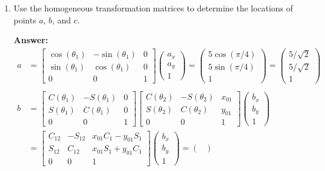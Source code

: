 \documentclass[10pt,letterpaper]{article}
\begin{document}
\begin{enumerate}
\item Use the homogeneous transformation matrices to determine the locations of points $ a$, $ b$, and $ c$.

\textbf{Answer: }\begin{align*}
a &= \begin{bmatrix}
\cos(\theta_1) & -\sin(\theta_1) & 0 \\
\sin(\theta_1) &  \cos(\theta_1) & 0 \\
0 & 0 & 1
\end{bmatrix} \begin{pmatrix}
a_x \\
a_y \\
1
\end{pmatrix} = \begin{pmatrix}
5\cos(\pi/4) \\
5\sin(\pi/4) \\
1
\end{pmatrix} = \begin{pmatrix}
5/\sqrt{2} \\
5/\sqrt{2} \\
1
\end{pmatrix} \\
\\
b &= \begin{bmatrix}
C(\theta_1) & -S(\theta_1) & 0 \\
S(\theta_1) &  C(\theta_1) & 0 \\
0 & 0 & 1
\end{bmatrix} \begin{bmatrix}
C(\theta_2) & -S(\theta_2) & x_{01} \\
S(\theta_2) &  C(\theta_2) & y_{01} \\
0 & 0 & 1
\end{bmatrix} \begin{pmatrix}
b_x \\
b_y \\
1
\end{pmatrix} \\
&= \begin{bmatrix}
C_{12} & -S_{12} & x_{01}C_1-y_{01}S_1 \\
S_{12} &  C_{12} & x_{01}S_1+y_{01}C_1 \\
0 & 0 & 1
\end{bmatrix} \begin{pmatrix}
b_x \\
b_y \\
1
\end{pmatrix} = \begin{pmatrix}

\end{pmatrix}
\end{align*}
\end{enumerate}
\end{document}
